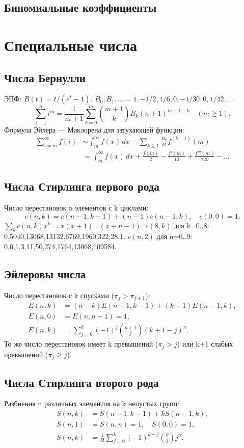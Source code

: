 \subsection{Биномиальные коэффициенты}
\section{Специальные числа}
\subsection{Числа Бернулли}
ЭПФ: $B(t)=t/(e^t-1)$.
$B_0,B_1,\dots=1,-1/2,1/6,0,-1/30,0,1/42,\dots$.
\[\sum_{i=1}^n i^m=\frac1{m+1}\sum_{k=0}^{m}
\binom{m+1}{k}B_k(n+1)^{m+1-k}\quad(m\ge1).\]
Формула Эйлера — Маклорена для затухающей функции:
\begin{align*}
\sum_{i=m}^{\infty}f(i)&\sim\int_m^\infty f(x)\,dx-
\sum_{k\ge1}\frac{B_k}{k!}f^{(k-1)}(m)\\
&=\int_m^\infty f(x)\,dx+\frac{f(m)}2-\frac{f'(m)}{12}
+\frac{f'''(m)}{720}-\dots
\end{align*}
\subsection{Числа Стирлинга первого рода}
Число перестановок n элементов с k циклами:
\[c(n,k)=c(n-1,k-1)+(n-1)c(n-1,k),\quad c(0,0)=1.\]
$\sum_kc(n,k)x^k=x(x+1)\dots(x+n-1)$.
$c(8,k)$ для k=0..8:
0,5040,13068,13132,6769,1960,322,28,1.
$c(n,2)$ для n=0..9: 0,0,1,3,11,50,274,1764,13068,109584.
\subsection{Эйлеровы числа}
Число перестановок с k спусками ($\pi_j>\pi_{j+1}$):
\begin{align*}
E(n,k)&=(n-k)E(n-1,k-1)+(k+1)E(n-1,k),\\
E(n,0)&=E(n,n-1)=1,\\
E(n,k)&=\sum_{j=0}^{k}(-1)^j\binom{n+1}{j}(k+1-j)^n.
\end{align*}
То же число перестановок имеет k превышений ($\pi_j>j$)
или k+1 слабых превышений ($\pi_j\ge j$).
\subsection{Числа Стирлинга второго рода}
Разбиения n различных элементов на k непустых групп:
\begin{align*}
S(n,k)&=S(n-1,k-1)+kS(n-1,k),\\
S(n,1)&=S(n,n)=1,\quad S(0,0)=1,\\
S(n,k)&=\frac1{k!}\sum_{j=0}^{k}(-1)^{k-j}\binom kjj^n.
\end{align*}
